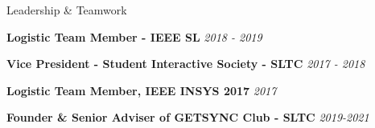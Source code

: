 \documentclass[
	11pt, %
]{./assets/resume} %
\begin{document}

\begin{rSection}{Leadership \& Teamwork}

	\textbf{Logistic Team Member - IEEE SL} \hfill \textit{2018 - 2019}

	\textbf{Vice President - Student Interactive Society - SLTC} \hfill \textit{2017 - 2018}
	
	\textbf{Logistic Team Member, IEEE INSYS 2017} \hfill \textit{2017}

	\textbf{Founder \& Senior Adviser of GETSYNC Club - SLTC} \hfill \textit{2019-2021}

\end{rSection}
















\end{document}
